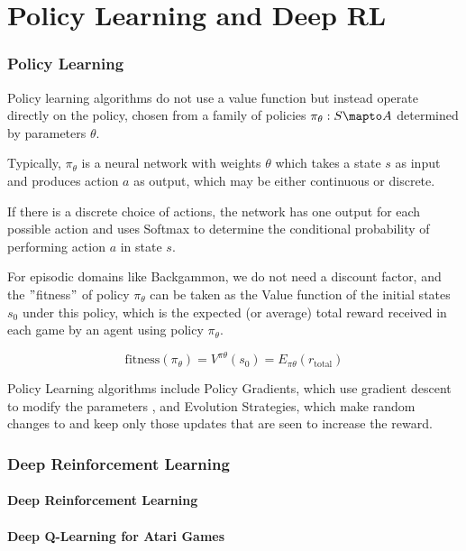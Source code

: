 \documentclass[11pt]{article}
\begin{document}
\part{Policy Learning and Deep RL}\label{part:policy-learning-and-deep-rl}

\section{Policy Learning}\label{sec:policy-learning}
Policy learning algorithms do not use a value function but instead operate
directly on the policy, chosen from a family of policies
$\pi_{\theta}: S \mapto A$ determined by parameters $\theta$.

Typically, $\pi_{\theta}$ is a neural network with weights $\theta$ which takes
a state $s$ as input and produces action $a$ as output, which may be either
continuous or discrete.

If there is a discrete choice of actions, the network has one output for each
possible action and uses Softmax to determine the conditional probability  of
performing action $a$ in state $s$.

For episodic domains like Backgammon, we do not need a discount factor, and the
\("\)fitness\("\) of policy $\pi_{\theta}$ can be taken as the Value function of the initial
states $s_0$ under this policy, which is the expected (or average) total reward
received in each game by an agent using policy $\pi_{\theta}$.

\[\text{fitness}(\pi_{\theta}) = V^{\pi \theta}(s_0) = E_{\pi \theta} (r_{\text{total}})\]

Policy Learning algorithms include Policy Gradients, which use gradient descent
to modify the parameters $$, and Evolution Strategies, which make random changes
to  and keep only those updates that are seen to increase the reward.

\section{Deep Reinforcement Learning}\label{sec:deep-reinforcement-learning}
\subsection{Deep Reinforcement Learning}\label{subsec:deep-reinforcement-learning}
\subsection{Deep Q-Learning for Atari Games}\label{subsec:deep-q-learning-for-atari-games}
\end{document}
